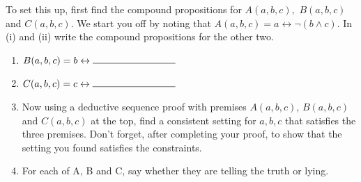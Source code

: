 \documentclass[12pt]{article}
\begin{document}
\begin{enumerate}[(a)]
			To set this up, first find the compound propositions for $A(a,b,c),$
			$B(a,b,c)$ and $C(a,b,c).$ We start you off by noting that
			$A(a,b,c) = a \leftrightarrow \neg(b \wedge c)$. In (i) and (ii) write the
			compound propositions for the other two.



			\begin{enumerate}
				\item[(i)] $B(a,b,c) = b \leftrightarrow \rule{3cm}{0.4pt}$

				\item[(ii)] $C(a,b,c) = c \leftrightarrow \rule{3cm}{0.4pt}$

				\item[(iii)] Now using a deductive sequence proof with premises $A(a,b,c)$,
					$B(a,b,c)$ and $C(a,b,c)$ at the top, find a consistent setting for $a,
					b,c$ that satisfies the three premises. Don't forget, after completing
					your proof, to show that the setting you found satisfies the
					constraints.

				\item[(iv)] For each of A, B and C, say whether they are telling the truth
					or lying.
			\end{enumerate}
	\end{enumerate}

	\newpage
\end{document}
